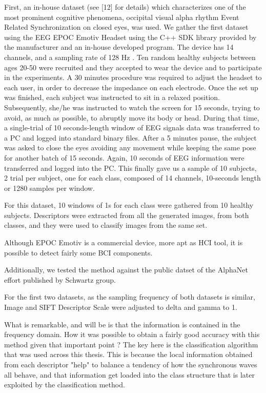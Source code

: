 First, an in-house dataset (see [12] for details) which characterizes one of the most prominent cognitive phenomena, occipital visual alpha rhythm Event Related Synchronization on closed eyes, was used.  We gather the first dataset using the EEG EPOC Emotiv Headset using the C++ SDK library provided by the manufacturer and an in-house developed program. The device has 14 channels, and a sampling rate of 128 Hz \cite{c11}. Ten random healthy subjects between ages 20-50 were recruited and they accepted to wear the device and to participate in the experiments.  A 30 minutes procedure was required to adjust the headset to each user, in order to decrease the impedance on each electrode. Once the set up was finished, each subject was instructed to sit in a relaxed position. Subsequently, she/he was instructed to watch the screen for 15 seconds, trying to avoid, as much as possible, to abruptly move its body or head.  During that time, a single-trial of 10 seconds-length window of EEG signals data was transferred to a PC and logged into standard binary files. After a 5 minutes pause, the subject was asked to close the eyes avoiding any movement while keeping the same pose for another batch of 15 seconds.  Again, 10 seconds of EEG information were transferred and logged into the PC. This finally gave us a sample of 10 subjects,  2 trial per subject, one for each class, composed of 14 channels, 10-seconds length or 1280 samples per window. 

For this dataset, 10 windows of 1s for each class were gathered from 10 healthy subjects.  Descriptors were extracted from all the generated images, from both classes, and they were used to classify images from the same set.     
   

   
Although EPOC Emotiv is a commercial device, more apt as HCI tool, it is possible to detect fairly some BCI components.
      
Additionally, we tested the method against the public datset of the AlphaNet effort published by Schwartz group.


For the first two datasets, as the sampling frequency of both datasets is similar, Image and SIFT Descriptor Scale were adjusted to delta and gamma to 1.

What is remarkable, and will be is that the information is contained in the frequency domain.  How it was possible to obtain a fairly good accuracy with this method given that important point ?  The key here is the classification algorithm that was used across this thesis.  This is because the local information obtained from each descriptor "help" to balance a tendency of how the synchronous waves all behave, and that information get loaded into the class structure that is later exploited by the classification method.

